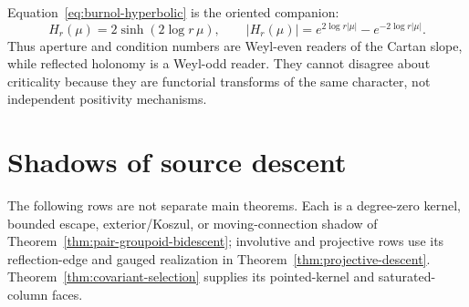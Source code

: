 \documentclass[11pt]{article}
\theoremstyle{definition}
\theoremstyle{remark}
\begin{document}
Equation~\eqref{eq:burnol-hyperbolic} is the oriented companion:
\[
 H_r(\mu)=2\sinh(2\log r\,\mu),\qquad
 |H_r(\mu)|=e^{2\log r|\mu|}-e^{-2\log r|\mu|}.
\tag{5.14}\label{eq:odd-even-cartan}
\]
Thus aperture and condition numbers are Weyl-even readers of the Cartan
slope, while reflected holonomy is a Weyl-odd reader.  They cannot disagree
about criticality because they are functorial transforms of the same
character, not independent positivity mechanisms.

\clearpage
\section{Shadows of source descent}

The following rows are not separate main theorems.  Each is a degree-zero
kernel, bounded escape, exterior/Koszul, or moving-connection shadow of
Theorem~\ref{thm:pair-groupoid-bidescent}; involutive and projective rows use
its reflection-edge and gauged
realization in Theorem~\ref{thm:projective-descent}.
Theorem~\ref{thm:covariant-selection} supplies its pointed-kernel and
saturated-column faces.
\end{document}

